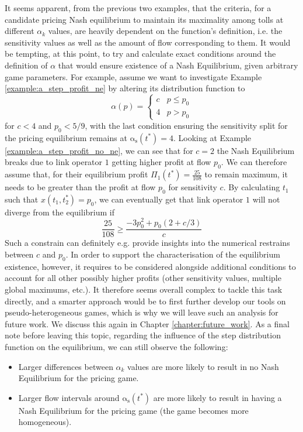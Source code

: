 \documentclass[10pt,a4paper]{book}
\newcommand{\as}{\mathrm{\alpha_s}}
\theoremstyle{definition}
\theoremstyle{comment}
\begin{document}
It seems apparent, from the previous two examples, that the criteria, for a candidate pricing Nash equilibrium to maintain its maximality among tolls at different $\alpha_k$ values, are heavily dependent on the function's definition, i.e. the sensitivity values as well as the amount of flow corresponding to them.
It would be tempting, at this point, to try and calculate exact conditions around the definition of $\alpha$ that would ensure existence of a Nash Equilibrium, given arbitrary game parameters.
For example, assume we want to investigate Example \ref{example:a_step_profit_ne} by altering its distribution function to
\[
	\alpha(p) =
	\begin{cases}
		c & p \le p_0 \\
		4 & p > p_0
	\end{cases}
\]
for $c < 4$ and $p_0 < 5/9$, with the last condition ensuring the sensitivity split for the pricing equilibrium remains at $\as(t^*) = 4$.
Looking at Example \ref{example:a_step_profit_no_ne}, we can see that for $c = 2$ the Nash Equilibrium breaks due to link operator $1$ getting higher profit at flow $p_0$.
We can therefore assume that, for their equilibrium profit $\Pi_1(t^*) = \tfrac{25}{108}$ to remain maximum, it needs to be greater than the profit at flow $p_0$ for sensitivity $c$.
By calculating $t_1$ such that $x(t_1, t_2^*) = p_0$, we can eventually get that link operator $1$ will not diverge from the equilibrium if
\[
	\frac{25}{108} \ge \frac{-3p_0^2 + p_0 (2 + c/3)}{c}
\]
Such a constrain can definitely e.g. provide insights into the numerical restrains between $c$ and $p_0$.
In order to support the characterisation of the equilibrium existence, however, it requires to be considered alongside additional conditions to account for all other possibly higher profits (other sensitivity values, multiple global maximums, etc.).
It therefore seems overall complex to tackle this task directly, and a smarter approach would be to first further develop our tools on pseudo-heterogeneous games, which is why we will leave such an analysis for future work.
We discuss this again in Chapter \ref{chapter:future_work}.
As a final note before leaving this topic, regarding the influence of the step distribution function on the equilibrium, we can still observe the following:
\begin{itemize}
	\item Larger differences between $\alpha_k$ values are more likely to result in no Nash Equilibrium for the pricing game.
	\item Larger flow intervals around $\as(t^*)$ are more likely to result in having a Nash Equilibrium for the pricing game (the game becomes more homogeneous).
\end{itemize}
\end{document}
